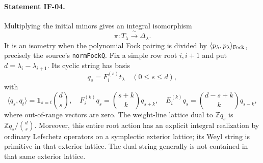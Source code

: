 \documentclass[11pt,a4paper]{article}
\theoremstyle{definition}
\theoremstyle{remark}
\begin{document}
\paragraph{Statement IF-04.}
Multiplying the initial minors gives an integral isomorphism
\[
 \pi:T_\lambda\xrightarrow{\ \sim\ }\Delta_\lambda.
\]
It is an isometry when the polynomial Fock pairing is divided by
$\langle p_\lambda,p_\lambda\rangle_{\rm Fock}$, precisely the source's
\texttt{normFockQ}. Fix a simple row root $i,i+1$ and put
$d=\lambda_i-\lambda_{i+1}$. Its cyclic string has basis
\[
 q_s=F_i^{(s)}t_\lambda\quad(0\leq s\leq d),
\]
with
\[
 \langle q_s,q_t\rangle=\boldsymbol1_{s=t}\binom ds,
 \quad F_i^{(k)}q_s=\binom{s+k}{k}q_{s+k},
 \quad E_i^{(k)}q_s=\binom{d-s+k}{k}q_{s-k},                 \tag{IF-04a}
\]
where out-of-range vectors are zero. The weight-line lattice dual to
$\mathbb Z q_s$ is $\mathbb Z q_s/\binom ds$. Moreover, this entire
root action has an explicit integral realization by ordinary Lefschetz
operators on a symplectic exterior lattice; its Weyl string is primitive
in that exterior lattice. The dual string generally is not contained in
that same exterior lattice.
\end{document}
